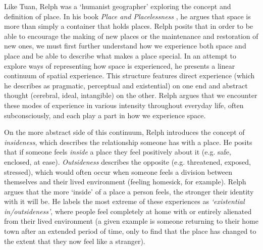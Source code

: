 Like Tuan, Relph was a `humanist geographer' exploring the concept and definition of place. In his book \textit{Place and Placelessness} \citep{Relph1976}, he argues that space is more than simply a container that holds places. Relph posits that in order to be able to encourage the making of new places or the maintenance and restoration of new ones, we must first further understand how we experience both space and place and be able to describe what makes a place special. In an attempt to explore ways of representing how space is experienced, he presents a linear continuum of spatial experience. This structure features direct experience (which he describes as pragmatic, perceptual and existential) on one end and abstract thought (cerebral, ideal, intangible) on the other. Relph argues that we encounter these modes of experience in various intensity throughout everyday life, often subconsciously, and each play a part in how we experience space.

On the more abstract side of this continuum, Relph introduces the concept of \textit{insideness}, which describes the relationship someone has with a place. He posits that if someone feels \textit{inside} a place they feel positively about it (e.g. safe, enclosed, at ease). \textit{Outsideness} describes the opposite (e.g. threatened, exposed, stressed), which would often occur when someone feels a division between themselves and their lived environment (feeling homesick, for example). Relph argues that the more `inside' of a place a person feels, the stronger their identity with it will be. He labels the most extreme of these experiences as \textit{`existential in/outsideness'}, where people feel completely at home with or entirely alienated from their lived environment (a given example is someone returning to their home town after an extended period of time, only to find that the place has changed to the extent that they now feel like a stranger).  

